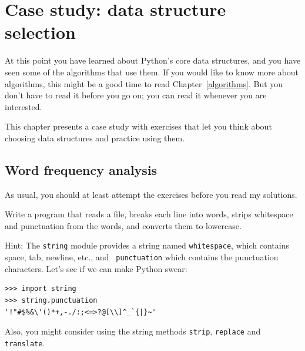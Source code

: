 \documentclass[10pt]{book}
\begin{document}




\chapter{Case study: data structure selection}

At this point you have learned about Python's core data structures,
and you have seen some of the algorithms that use them.
If you would like to know more about algorithms, this might be a good
time to read Chapter~\ref{algorithms}.
But you don't have to read it before you go on; you can read
it whenever you are interested.

This chapter presents a case study with exercises that let
you think about choosing data structures and practice using them.


\section{Word frequency analysis}
\label{analysis}

As usual, you should at least attempt the exercises
before you read my solutions.

\begin{exercise}

Write a program that reads a file, breaks each line into
words, strips whitespace and punctuation from the words, and
converts them to lowercase.

Hint: The {\tt string} module provides a string named {\tt whitespace},
which contains space, tab, newline, etc., and {\tt
  punctuation} which contains the punctuation characters.  Let's see
if we can make Python swear:

\begin{verbatim}
>>> import string
>>> string.punctuation
'!"#$%&\'()*+,-./:;<=>?@[\\]^_`{|}~'
\end{verbatim}
%
Also, you might consider using the string methods {\tt strip},
{\tt replace} and {\tt translate}.

\end{exercise}
\end{document}
